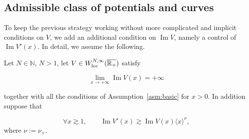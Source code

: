 \subsection{Admissible class of potentials and curves}
\label{subsec:gc.pot.curv}
To keep the previous strategy working without more complicated and implicit conditions on $V$, we add an additional condition on ${\operatorname{Im}} V$, namely a control of ${\operatorname{Im}} V'(x)$. In detail, we assume the following.
\begin{Assumption}
	\label{asm:basic.gen}
	Let $N\in {\mathbb{N}}$, $N>1$, let $V \in W^{N,\infty}_{\rm loc}(\overline{{\mathbb{R}}_+})$ satisfy
	
	\begin{equation}\label{asm.eq.ImV.gen}
	\lim_{x \to +\infty} {\operatorname{Im}} V(x) = + \infty
	\end{equation}
	
	together with all the conditions of 
	Assumption~\ref{asm:basic} for $x>0$. In addition suppose that 
	
	\begin{equation}\label{asm.eq:ImV'.lb}
	\forall x {\gtrsim} 1, \qquad {\operatorname{Im}} V'(x)  {\gtrsim}  {\operatorname{Im}} V(x) \langle x \rangle^\nu, 
	\end{equation}
		where $\nu:=\nu_+$. 
\end{Assumption} 

